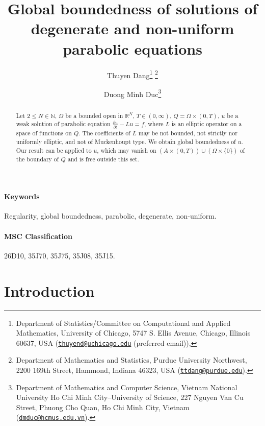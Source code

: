 \documentclass[11pt, a4paper]{article}
\numberwithin{equation}{section}
\newcommand{\NN}{{\mathbb N}}
\newcommand{\RR}{{\mathbb R}}
\newcommand{\email}[1]{\href{mailto:#1}{\texttt{#1}}}
\begin{document}
\title{Global boundedness of solutions of degenerate and
  non-uniform parabolic equations}

\author{ Thuyen Dang\footnote{
    Department of Statistics/Committee on
    Computational and Applied Mathematics, University of Chicago, 5747
    S. Ellis Avenue, Chicago, Illinois 60637, USA
    (\email{thuyend@uchicago.edu} (preferred email)),
  } \footnote{Department of Mathematics and Statistics, Purdue University Northwest, 2200 169th Street, Hammond, Indiana 46323, USA
  (\email{ttdang@purdue.edu}).}
\and
  Duong Minh Duc\footnote{
    Department of Mathematics and Computer Science, Vietnam
    National University Ho Chi Minh City--University of Science, 227
    Nguyen Van Cu Street, Phuong Cho Quan, Ho Chi Minh City, Vietnam
  (\email{dmduc@hcmus.edu.vn}).}
}
\date{}

\maketitle

\begin{abstract}
  Let $2 \le N\in\NN$, $\Omega$ be a bounded open in $\RR^{N}$,
  $T\in (0,\infty)$, $Q=\Omega\times (0,T)$, $u$ be a weak solution of
  parabolic equation
  $\displaystyle \frac{\partial u}{\partial t} -Lu= f$, where $L$ is
  an elliptic operator on a space of functions on $Q$. The
  coefficients of $L$ may be not bounded, not strictly nor uniformly
  elliptic, and not of Muckenhoupt type. We obtain global boundedness
  of $u$.  Our result can be applied to $u$, which may vanish on
  $(A\times (0,T))\cup (\Omega\times \{0\})$ of the boundary of $Q$
  and is free outside this set.
\end{abstract}

\paragraph{Keywords} Regularity, global boundedness, parabolic,
degenerate, non-uniform.
\paragraph{MSC Classification} 26D10, 35J70, 35J75, 35J08, 35J15.




\section{Introduction}
\end{document}
